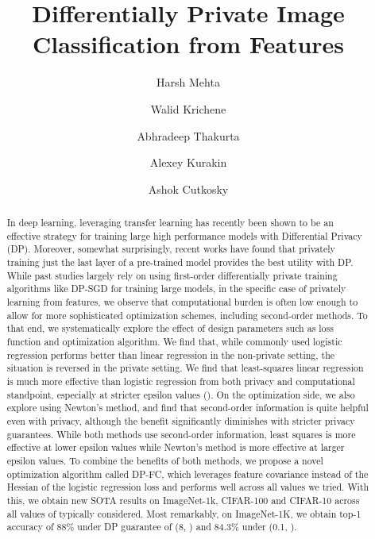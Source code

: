 \documentclass[letterpaper]{article} \usepackage{fullpage}
\title{Differentially Private Image Classification from Features}
\author[1]{Harsh Mehta}
\author[1]{Walid Krichene}
\author[1]{Abhradeep Thakurta}
\author[1]{Alexey Kurakin}
\author[2]{Ashok Cutkosky}
\affil[1]{Google Research \thanks{}}
\affil[2]{Boston University \thanks{}}
\date{}
\begin{document}
\maketitle

\begin{abstract}
In deep learning, leveraging transfer learning has recently been shown to be an effective strategy for training large high performance models with Differential Privacy (DP). Moreover, somewhat surprisingly, recent works have found that privately training just the last layer of a pre-trained model provides the best utility with DP. While past studies largely rely on using first-order differentially private training algorithms like DP-SGD for training large models, in the specific case of privately learning from features, we observe that computational burden is often low enough to allow for more sophisticated optimization schemes, including second-order methods. To that end, we systematically explore the effect of design parameters such as loss function and optimization algorithm. We find that, while commonly used logistic regression performs better than linear regression in the non-private setting, the situation is reversed in the private setting. We find that least-squares linear regression is much more effective than logistic regression from both privacy and computational standpoint, especially at stricter epsilon values (). On the optimization side, we also explore using Newton's method, and find that second-order information is quite helpful even with privacy, although the benefit significantly diminishes with stricter privacy guarantees. While both methods use second-order information, least squares is more effective at lower epsilon values while Newton's method is more effective at larger epsilon values. To combine the benefits of both methods, we propose a novel optimization algorithm called DP-FC, which leverages feature covariance instead of the Hessian of the logistic regression loss and performs well across all  values we tried. With this, we obtain new SOTA results on ImageNet-1k, CIFAR-100 and CIFAR-10 across all values of  typically considered. Most remarkably, on ImageNet-1K, we obtain top-1 accuracy of 88\% under DP guarantee of (8, ) and 84.3\% under (0.1, ).
\end{abstract}
\end{document}

